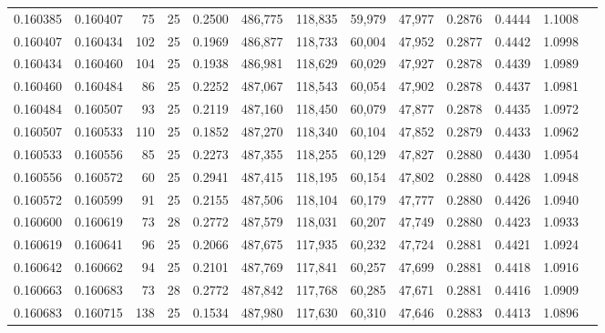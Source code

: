 \begin{tabular}{rrrrrrrrrrrrr}
0.160385 & 0.160407 &    75 &  25 &                                     0.2500 & 486,775 & 118,835 &  59,979 &  47,977 & 0.2876 & 0.4444 & 1.1008 \\
0.160407 & 0.160434 &   102 &  25 &                                     0.1969 & 486,877 & 118,733 &  60,004 &  47,952 & 0.2877 & 0.4442 & 1.0998 \\
0.160434 & 0.160460 &   104 &  25 &                                     0.1938 & 486,981 & 118,629 &  60,029 &  47,927 & 0.2878 & 0.4439 & 1.0989 \\
0.160460 & 0.160484 &    86 &  25 &                                     0.2252 & 487,067 & 118,543 &  60,054 &  47,902 & 0.2878 & 0.4437 & 1.0981 \\
0.160484 & 0.160507 &    93 &  25 &                                     0.2119 & 487,160 & 118,450 &  60,079 &  47,877 & 0.2878 & 0.4435 & 1.0972 \\
0.160507 & 0.160533 &   110 &  25 &                                     0.1852 & 487,270 & 118,340 &  60,104 &  47,852 & 0.2879 & 0.4433 & 1.0962 \\
0.160533 & 0.160556 &    85 &  25 &                                     0.2273 & 487,355 & 118,255 &  60,129 &  47,827 & 0.2880 & 0.4430 & 1.0954 \\
0.160556 & 0.160572 &    60 &  25 &                                     0.2941 & 487,415 & 118,195 &  60,154 &  47,802 & 0.2880 & 0.4428 & 1.0948 \\
0.160572 & 0.160599 &    91 &  25 &                                     0.2155 & 487,506 & 118,104 &  60,179 &  47,777 & 0.2880 & 0.4426 & 1.0940 \\
0.160600 & 0.160619 &    73 &  28 &                                     0.2772 & 487,579 & 118,031 &  60,207 &  47,749 & 0.2880 & 0.4423 & 1.0933 \\
0.160619 & 0.160641 &    96 &  25 &                                     0.2066 & 487,675 & 117,935 &  60,232 &  47,724 & 0.2881 & 0.4421 & 1.0924 \\
0.160642 & 0.160662 &    94 &  25 &                                     0.2101 & 487,769 & 117,841 &  60,257 &  47,699 & 0.2881 & 0.4418 & 1.0916 \\
0.160663 & 0.160683 &    73 &  28 &                                     0.2772 & 487,842 & 117,768 &  60,285 &  47,671 & 0.2881 & 0.4416 & 1.0909 \\
0.160683 & 0.160715 &   138 &  25 &                                     0.1534 & 487,980 & 117,630 &  60,310 &  47,646 & 0.2883 & 0.4413 & 1.0896 \\

\end{tabular}
